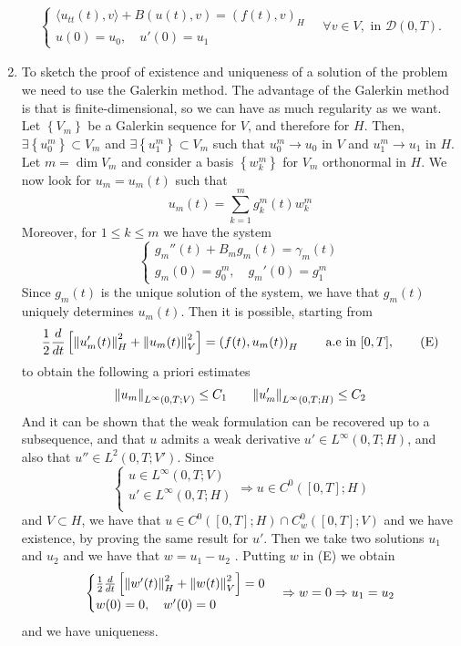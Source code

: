 \begin{enumerate}
\[\begin{split}
            \begin{cases}
                \langle u_{tt}(t), v \rangle + B(u(t), v) = (f(t), v)_H \\
                u(0) = u_0, \quad u'(0) = u_1
            \end{cases}\quad \forall v \in V, \text{ in } \mathcal{D}(0, T).
        \end{split}
    \]
    \item To sketch the proof of existence and uniqueness of a solution of the problem we need to use the Galerkin method. The advantage of the Galerkin method is that is finite-dimensional, so we can have as much regularity as we want. Let \(\left\{V_m\right\}\) be a Galerkin sequence for \(V\), and therefore for \(H\). Then, \(\exists \left\{u_0^m\right\} \subset V_m\) and \(\exists \left\{u_1^m\right\} \subset V_m\) such that \(u_0^m \to u_0\) in \(V\) and \(u_1^m \to u_1\) in \(H\). Let \(m = \dim V_m\) and consider a basis \(\left\{w_k^m\right\}\) for \(V_m\) orthonormal in \(H\). We now look for \(u_m = u_m(t)\) such that
    \[
        u_m(t) = \sum_{k=1}^m g_k^m(t) w_k^m
    \]
    Moreover, for \(1 \leq k \leq m\) we have the system
    \[
        \begin{cases}
            g_m''(t) + B_m g_m(t) = \gamma_m(t) \\
            g_m(0) = g_0^m, \quad g_m'(0) = g_1^m
        \end{cases}
    \]
    Since \(g_m(t)\) is the unique solution of the system, we have that \(g_m(t)\) uniquely determines \(u_m(t)\). Then it is possible, starting from 
    \[
        \frac{1}{2}\frac{d}{dt} \left[\norm{u_m'(t)}_H^2 + \norm{u_m(t)}_V^2\right] = \left(f(t), u_m(t)\right)_H \qquad \text{a.e in } [0, T],
        \tag*{(E)}
    \]
    to obtain the following a priori estimates
    \[
        \norm{u_m}_{L^\infty(0, T; V)} \leq C_1 \qquad \norm{u_m'}_{L^\infty(0, T; H)} \leq C_2
    \]
    And it can be shown that the weak formulation can be recovered up to a subsequence, and that \(u\) admits a weak derivative \(u' \in L^\infty(0, T; H)\), and also that \(u'' \in L^2(0, T; V')\).
    Since 
    \[
    \begin{cases}
        u \in L^\infty(0, T; V) \\
        u' \in L^\infty(0, T; H) \\
    \end{cases}
    \Rightarrow u \in C^0([0, T]; H) 
    \]
    and \(V \subset H\), we have that \(u \in C^0([0, T]; H) \cap C_w^0([0, T]; V)\) and we have existence, by proving the same result for \(u'\).
    Then we take two solutions \(u_1\) and \(u_2\) and we have that \(w = u_1 - u_2\) . Putting \(w\) in (E) we obtain
    \[
        \begin{cases}
            \frac{1}{2}\frac{d}{dt} \left[\norm{w'(t)}_H^2 + \norm{w(t)}_V^2\right] = 0 \\
            w(0) = 0, \quad w'(0) = 0
        \end{cases} 
        \Rightarrow w = 0 \Rightarrow u_1 = u_2
    \]
    and we have uniqueness.
\end{enumerate}

